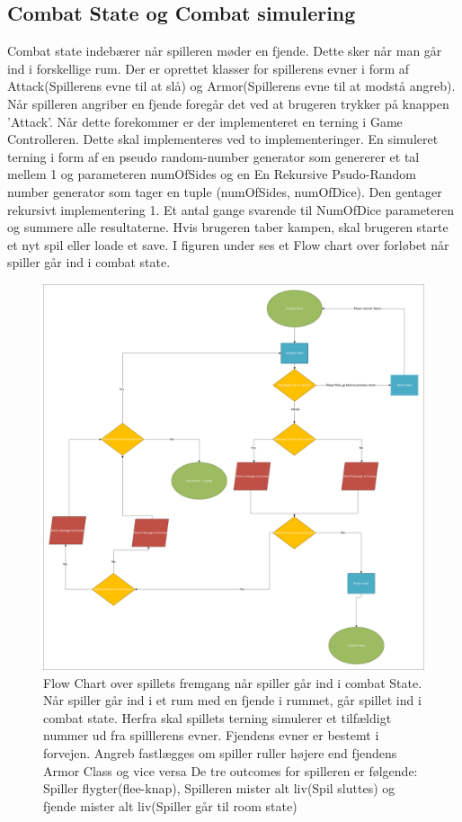 \subsection{Combat State og Combat simulering}
Combat state indebærer når spilleren møder en fjende. Dette sker når man går ind i forskellige rum. Der er oprettet klasser for spillerens evner i form af Attack(Spillerens evne til at slå) og Armor(Spillerens evne til at modstå angreb). Når spilleren angriber en fjende foregår det ved at brugeren trykker på knappen ’Attack’. Når dette forekommer er der implementeret en terning i Game Controlleren. Dette skal implementeres ved to implementeringer. En simuleret terning i form af en pseudo random-number generator som genererer et tal mellem 1 og parameteren numOfSides og en  En Rekursive Psudo-Random number generator som tager en tuple (numOfSides, numOfDice). Den gentager rekursivt implementering 1. Et antal gange svarende til NumOfDice parameteren og summere alle resultaterne.  Hvis brugeren taber kampen, skal brugeren starte et nyt spil eller loade et save. I figuren under ses et Flow chart over forløbet når spiller går ind i combat state.
\begin{figure}[H]
\centering
\includegraphics[width = \textwidth]{02-Body/Images/Arkitektur - Combat State.pdf}
\caption{Flow Chart over spillets fremgang når spiller går ind i combat State. Når spiller går ind i et rum med en fjende i rummet, går spillet ind i combat state. Herfra skal spillets terning simulerer et tilfældigt nummer ud fra spilllerens evner. Fjendens evner er bestemt i forvejen. Angreb fastlægges om spiller ruller højere end fjendens Armor Class og vice versa De tre outcomes for spilleren er følgende: Spiller flygter(flee-knap), Spilleren mister alt liv(Spil sluttes) og fjende mister alt liv(Spiller går til room state)}
\label{fig:Arkitektur-SD-SaveGame}
\end{figure}
